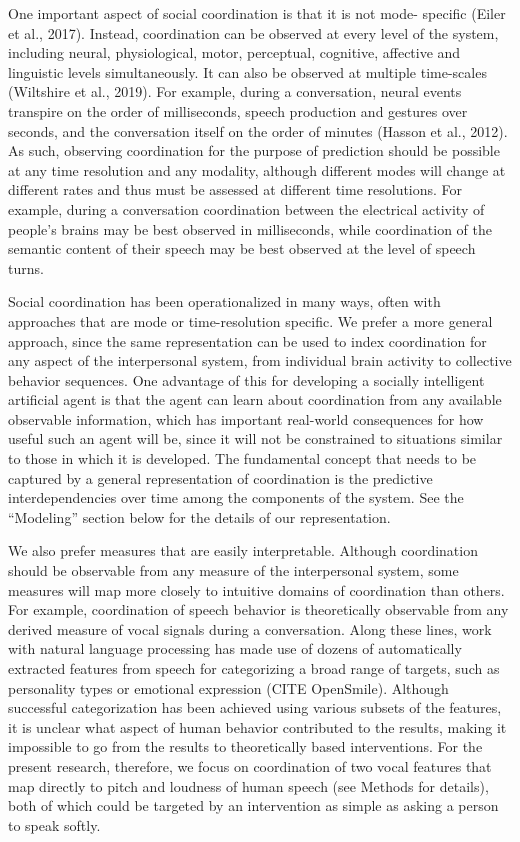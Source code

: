 One important aspect of social coordination is that it is not mode- specific
(Eiler et al., 2017). Instead, coordination can be observed at every level of
the system, including neural, physiological, motor, perceptual, cognitive,
affective and linguistic levels simultaneously. It can also be observed at
multiple time-scales (Wiltshire et al., 2019). For example, during a
conversation, neural events transpire on the order of milliseconds, speech
production and gestures over seconds, and the conversation itself on the order
of minutes (Hasson et al., 2012). As such, observing coordination for the
purpose of prediction should be possible at any time resolution and any
modality, although different modes will change at different rates and thus must
be assessed at different time resolutions. For example, during a conversation
coordination between the electrical activity of people’s brains may be best
observed in milliseconds, while coordination of the semantic content of their
speech may be best observed at the level of speech turns.

Social coordination has been operationalized in many ways, often with approaches
that are mode or time-resolution specific. We prefer a more general approach,
since the same representation can be used to index coordination for any aspect
of the interpersonal system, from individual brain activity to collective
behavior sequences. One advantage of this for developing a socially intelligent
artificial agent is that the agent can learn about coordination from any
available observable information, which has important real-world consequences
for how useful such an agent will be, since it will not be constrained to
situations similar to those in which it is developed. The fundamental concept
that needs to be captured by a general representation of coordination is the
predictive interdependencies over time among the components of the system. See
the “Modeling” section below for the details of our representation.

We also prefer measures that are easily interpretable. Although coordination
should be observable from any measure of the interpersonal system, some measures
will map more closely to intuitive domains of coordination than others. For
example, coordination of speech behavior is theoretically observable from any
derived measure of vocal signals during a conversation. Along these lines, work
with natural language processing has made use of dozens of automatically
extracted features from speech for categorizing a broad range of targets, such
as personality types or emotional expression (CITE OpenSmile). Although
successful categorization has been achieved using various subsets of the
features, it is unclear what aspect of human behavior contributed to the
results, making it impossible to go from the results to theoretically based
interventions. For the present research, therefore, we focus on coordination of
two vocal features that map directly to pitch and loudness of human speech (see
Methods for details), both of which could be targeted by an intervention as
simple as asking a person to speak softly. 

